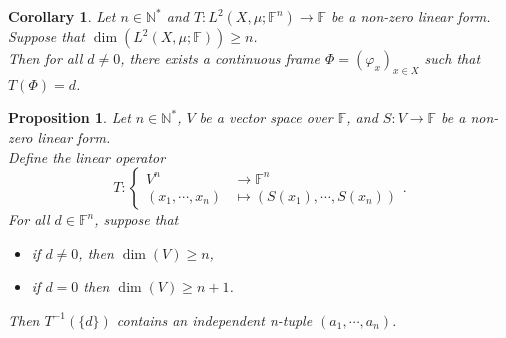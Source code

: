\documentclass[a4paper,12pt]{article}
\theoremstyle{plain}
\newtheorem{proposition}{Proposition}[section]
\newtheorem{corollary}{Corollary}[section]
\theoremstyle{definition}
\theoremstyle{remark}
\begin{document}
\begin{corollary}
\label{CorT^(-1)(d)ContainsFrameTArbitraryLinearFormCondDimL2X}
Let $n \in \mathbb{N}^*$ and $T : L^2(X,\mu;\mathbb{F}^n) \to \mathbb{F}$ be a non-zero linear form. \\
Suppose that $\dim(L^2(X,\mu;\mathbb{F})) \geq n$. \\
Then for all $d \neq 0$, there exists a continuous frame $\Phi = (\varphi_x)_{x \in X}$ such that $T(\Phi)=d$.
\end{corollary}



\begin{proposition}
\label{PropT^(-1)(d)ContainsFrameEachCordTDependsSeparatelyOnOneVarCondDimL2X}
Let $n \in \mathbb{N}^*$, $V$ be a vector space over $\mathbb{F}$, and $S : V \to \mathbb{F}$ be a non-zero linear form. \\
Define the linear operator 
\[ T : \begin{cases} V^n &\to \mathbb{F}^n \\ (x_1,\cdots,x_n) &\mapsto (S(x_1), \cdots, S(x_n)) \end{cases}. \]
For all $d \in \mathbb{F}^n$, suppose that
\begin{itemize}
\item if $d \neq 0$, then $\dim(V) \geq n$,
\item if $d = 0$ then $\dim(V) \geq n+1$.
\end{itemize}
Then $T^{-1}(\{d\})$ contains an independent n-tuple $(a_1,\cdots,a_n)$.
\end{proposition}
\end{document}
